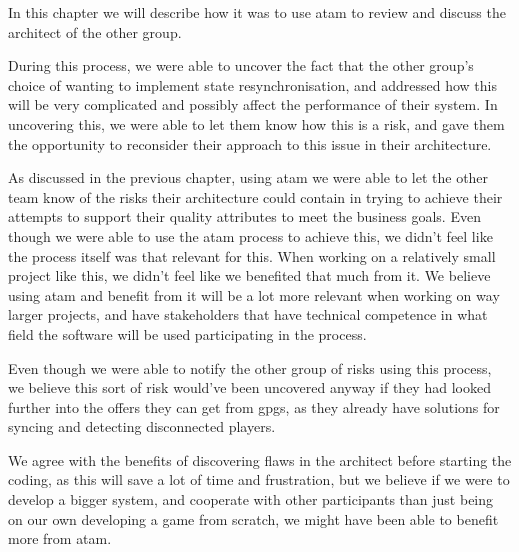 In this chapter we will describe how it was to use \gls{atam} to review and discuss the architect of the other group.

During this process, we were able to uncover the fact that the other group's choice of wanting to implement state resynchronisation, and addressed how this will be very complicated and possibly affect the performance of their system. In uncovering this, we were able to let them know how this is a risk, and gave them the opportunity to reconsider their approach to this issue in their architecture.

As discussed in the previous chapter, using \gls{atam} we were able to let the other team know of the risks their architecture could contain in trying to achieve their attempts to support their quality attributes to meet the business goals.
Even though we were able to use the \gls{atam} process to achieve this, we didn't feel like the process itself was that relevant for this. When working on a relatively small project like this, we didn't feel like we benefited that much from it. We believe using \gls{atam} and benefit from it will be a lot more relevant when working on way larger projects, and have stakeholders that have technical competence in what field the software will be used participating in the process. 

Even though we were able to notify the other group of risks using this process, we believe this sort of risk would've been uncovered anyway if they had looked further into the offers they can get from \gls{gpgs}, as they already have solutions for syncing and detecting disconnected players.

We agree with the benefits of discovering flaws in the architect before starting the coding, as this will save a lot of time and frustration, but we believe if we were to develop a bigger system, and cooperate with other participants than just being on our own developing a game from scratch, we might have been able to benefit more from \gls{atam}.